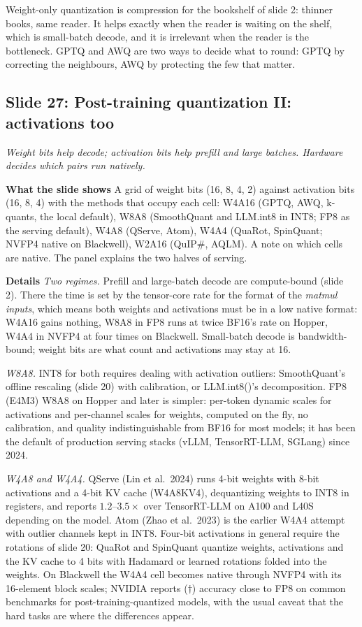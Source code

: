\documentclass[11pt,letterpaper]{article}
\newcommand{\slide}[3]{%
  \subsection[Slide #1: #2]{Slide #1: #2}%
  {\color{muted}\itshape #3\par}\medskip}
\newcommand{\para}[1]{\medskip\noindent\textbf{#1}\quad}
\newenvironment{intuition}{\begin{tcolorbox}[intuitionbox]}{\end{tcolorbox}}
\begin{document}
\begin{intuition}
Weight-only quantization is compression for the bookshelf of slide 2: thinner books, same reader. It helps exactly when the reader is waiting on the shelf, which is small-batch decode, and it is irrelevant when the reader is the bottleneck. GPTQ and AWQ are two ways to decide what to round: GPTQ by correcting the neighbours, AWQ by protecting the few that matter.
\end{intuition}

\slide{27}{Post-training quantization II: activations too}{Weight bits help decode; activation bits help prefill and large batches. Hardware decides which pairs run natively.}

\para{What the slide shows} A grid of weight bits (16, 8, 4, 2) against activation bits (16, 8, 4) with the methods that occupy each cell: W4A16 (GPTQ, AWQ, k-quants, the local default), W8A8 (SmoothQuant and LLM.int8 in INT8; FP8 as the serving default), W4A8 (QServe, Atom), W4A4 (QuaRot, SpinQuant; NVFP4 native on Blackwell), W2A16 (QuIP\#, AQLM). A note on which cells are native. The panel explains the two halves of serving.

\para{Details} \emph{Two regimes.} Prefill and large-batch decode are compute-bound (slide 2). There the time is set by the tensor-core rate for the format of the \emph{matmul inputs}, which means both weights and activations must be in a low native format: W4A16 gains nothing, W8A8 in FP8 runs at twice BF16's rate on Hopper, W4A4 in NVFP4 at four times on Blackwell. Small-batch decode is bandwidth-bound; weight bits are what count and activations may stay at 16.

\emph{W8A8.} INT8 for both requires dealing with activation outliers: SmoothQuant's offline rescaling (slide 20) with calibration, or LLM.int8()'s decomposition. FP8 (E4M3) W8A8 on Hopper and later is simpler: per-token dynamic scales for activations and per-channel scales for weights, computed on the fly, no calibration, and quality indistinguishable from BF16 for most models; it has been the default of production serving stacks (vLLM, TensorRT-LLM, SGLang) since 2024.

\emph{W4A8 and W4A4.} QServe (Lin et al.\ 2024) runs 4-bit weights with 8-bit activations and a 4-bit KV cache (W4A8KV4), dequantizing weights to INT8 in registers, and reports $1.2$--$3.5\times$ over TensorRT-LLM on A100 and L40S depending on the model. Atom (Zhao et al.\ 2023) is the earlier W4A4 attempt with outlier channels kept in INT8. Four-bit activations in general require the rotations of slide 20: QuaRot and SpinQuant quantize weights, activations and the KV cache to 4 bits with Hadamard or learned rotations folded into the weights. On Blackwell the W4A4 cell becomes native through NVFP4 with its 16-element block scales; NVIDIA reports ($\dagger$) accuracy close to FP8 on common benchmarks for post-training-quantized models, with the usual caveat that the hard tasks are where the differences appear.
\end{document}
